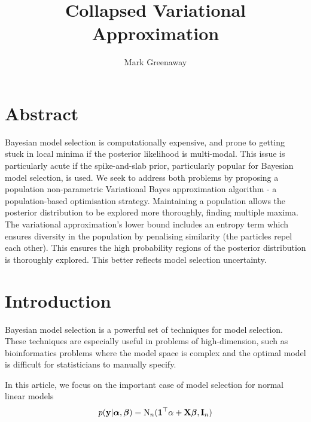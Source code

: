 \documentclass{amsart}[12pt]
\title{Collapsed Variational Approximation}
\author{Mark Greenaway}
\begin{document}
\setlength{\parindent}{0pt}
\maketitle

\section{Abstract}

Bayesian model selection is computationally expensive, and prone to getting stuck in local minima if the
posterior likelihood is multi-modal. This issue is particularly acute if the spike-and-slab prior,
particularly popular for Bayesian model selection, is used. We seek to address both problems by proposing a
population non-parametric Variational Bayes approximation algorithm - a population-based optimisation
strategy. Maintaining a population allows the posterior distribution to be explored more thoroughly, finding
multiple maxima. The variational approximation's lower bound includes an entropy term which ensures diversity
in the population by penalising similarity (the particles repel each other). This ensures the high probability
regions of the posterior distribution is thoroughly explored. This better reflects model selection
uncertainty.

\section{Introduction}

Bayesian model selection is a powerful set of techniques for model selection. These techniques are especially
useful in problems of high-dimension, such as bioinformatics problems where the model space is complex and
the optimal model is difficult for statisticians to manually specify.

In this article, we focus on the important case of model selection for normal linear models
\[
	p({\bf y} | {\boldsymbol \alpha}, {\boldsymbol \beta}) = \text{N}_n({\bf 1}^\top \alpha + {\bf X} {\boldsymbol \beta}, {\bf I}_n)
\]
\end{document}
